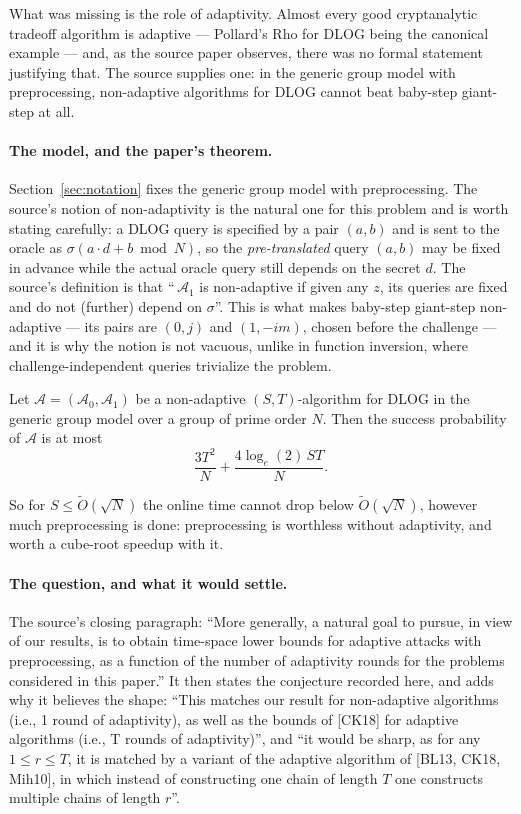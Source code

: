\documentclass{conjura-conjecture}
\newcommand{\Adv}{\mathcal{A}}
\newcommand{\Ot}{\widetilde{O}}
\begin{document}
What was missing is the role of adaptivity. Almost every good
cryptanalytic tradeoff algorithm is adaptive --- Pollard's Rho for
DLOG being the canonical example --- and, as the source paper observes,
there was no formal statement justifying that. The source supplies one:
in the generic group model with preprocessing, non-adaptive algorithms
for DLOG cannot beat baby-step giant-step at all.

\paragraph{The model, and the paper's theorem.}
Section~\ref{sec:notation} fixes the generic group model with
preprocessing. The source's notion of non-adaptivity is the natural one
for this problem and is worth stating carefully: a DLOG query is
specified by a pair $(a,b)$ and is sent to the oracle as
$\sigma(a \cdot d + b \bmod N)$, so the \emph{pre-translated} query
$(a,b)$ may be fixed in advance while the actual oracle query still
depends on the secret $d$. The source's definition is that
``\,$\Adv_{1}$ is non-adaptive if given any $z$, its queries are fixed
and do not (further) depend on $\sigma$''. This is what makes baby-step
giant-step non-adaptive --- its pairs are $(0, j)$ and $(1, -im)$,
chosen before the challenge --- and it is why the notion is not
vacuous, unlike in function inversion, where challenge-independent
queries trivialize the problem.

\begin{theorem}[The source's Theorem 1.1, the $r = 1$ case]\label{thm:one}
Let $\Adv = (\Adv_{0}, \Adv_{1})$ be a non-adaptive $(S,T)$-algorithm
for DLOG in the generic group model over a group of prime order $N$.
Then the success probability of $\Adv$ is at most
\[
  \frac{3T^{2}}{N} + \frac{4 \log_{e}(2) \, ST}{N}.
\]
\end{theorem}

So for $S \le \Ot(\sqrt{N})$ the online time cannot drop below
$\Ot(\sqrt{N})$, however much preprocessing is done: preprocessing is
worthless without adaptivity, and worth a cube-root speedup with it.

\paragraph{The question, and what it would settle.}
The source's closing paragraph: ``More generally, a natural goal to
pursue, in view of our results, is to obtain time-space lower bounds for
adaptive attacks with preprocessing, as a function of the number of
adaptivity rounds for the problems considered in this paper.'' It then
states the conjecture recorded here, and adds why it believes the shape:
``This matches our result for non-adaptive algorithms (i.e., 1 round of
adaptivity), as well as the bounds of [CK18] for adaptive algorithms
(i.e., T rounds of adaptivity)'', and ``it would be sharp, as for any
$1 \le r \le T$, it is matched by a variant of the adaptive algorithm
of [BL13, CK18, Mih10], in which instead of constructing one chain of
length $T$ one constructs multiple chains of length $r$''.
\end{document}

